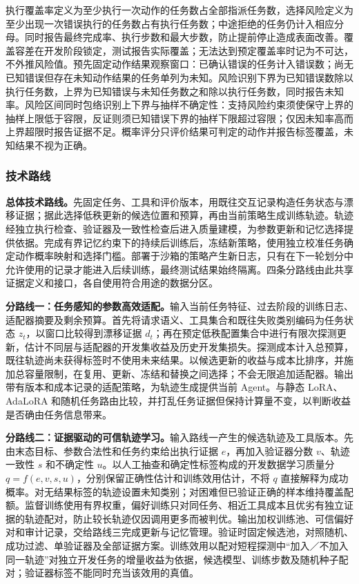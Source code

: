 执行覆盖率定义为至少执行一次动作的任务数占全部指派任务数，选择风险定义为至少出现一次错误执行的任务数占有执行任务数；中途拒绝的任务仍计入相应分母。同时报告最终完成率、执行步数和最大步数，防止提前停止造成表面改善。覆盖容差在开发阶段锁定，测试报告实际覆盖；无法达到预定覆盖率时记为不可达，不外推风险值。预先固定动作结果观察窗口：已确认错误的任务计入错误数；尚无已知错误但存在未知动作结果的任务单列为未知。风险识别下界为已知错误数除以执行任务数，上界为已知错误与未知任务数之和除以执行任务数，同时报告未知率。风险区间同时包络识别上下界与抽样不确定性：支持风险约束须使保守上界的抽样上限低于容限，反证则须已知错误下界的抽样下限超过容限；仅因未知率高而上界超限时报告证据不足。概率评分只评价结果可判定的动作并报告标签覆盖，未知结果不视为正确。

\subsubsection{技术路线}

\textbf{总体技术路线。}先固定任务、工具和评价版本，用既往交互记录构造任务状态与漂移证据；据此选择低秩更新的候选位置和预算，再由当前策略生成训练轨迹。轨迹经独立执行检查、验证器及一致性检查后进入质量建模，为参数更新和记忆选择提供依据。完成有界记忆约束下的持续后训练后，冻结新策略，使用独立校准任务确定动作概率映射和选择门槛。部署于沙箱的策略产生新日志，只有在下一轮划分中允许使用的记录才能进入后续训练，最终测试结果始终隔离。四条分路线由此共享证据定义和接口，各自使用符合用途的数据分区。

\textbf{分路线一：任务感知的参数高效适配。}输入当前任务特征、过去阶段的训练日志、适配器摘要及剩余预算。首先将请求语义、工具集合和既往失败类别编码为任务状态 $z_t$，以窗口比较得到漂移证据 $d_t$；再在预定低秩配置集合中进行有限次探测更新，估计不同层与适配器的开发集收益及历史开发集损失。探测成本计入总预算，既往轨迹尚未获得标签时不使用未来结果。以候选更新的收益与成本比排序，并施加总容量限制，在复用、更新、冻结和替换之间选择；不会无限追加适配器。输出带有版本和成本记录的适配策略，为轨迹生成提供当前 Agent。与静态 LoRA、AdaLoRA 和随机任务路由比较，并打乱任务证据但保持计算量不变，以判断收益是否确由任务信息带来\cite{lora,adalora}。

\textbf{分路线二：证据驱动的可信轨迹学习。}输入路线一产生的候选轨迹及工具版本。先由末态目标、参数合法性和任务约束给出执行证据 $e$，再加入验证器分数 $v$、轨迹一致性 $s$ 和不确定性 $u$。以人工抽查和确定性标签构成的开发数据学习质量分 $q=f(e,v,s,u)$，分别保留正确性估计和训练效用估计，不将 $q$ 直接解释为成功概率。对无结果标签的轨迹设置未知类别；对困难但已验证正确的样本维持覆盖配额。监督训练使用有界权重，偏好训练只对同任务、相近工具成本且优劣有独立证据的轨迹配对，防止较长轨迹仅因调用更多而被判优\cite{dpo,agenttuning}。输出加权训练池、可信偏好对和审计记录，交给路线三完成更新与记忆管理。验证时固定候选池，对照随机、成功过滤、单验证器及全部证据方案。训练效用以配对短程探测中“加入／不加入同一轨迹”对独立开发任务的增量收益为依据，候选模型、训练步数及随机种子配对；验证器标签不能同时充当该效用的真值。

